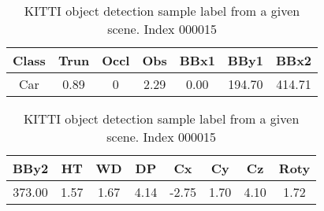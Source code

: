 \begin{table}[h]
\centering
\caption{KITTI object detection sample label from a given scene. Index 000015}
\begin{tabular}{|c|c|c|c|c|c|c|}
\hline
Class & Trun & Occl & Obs  & BBx1  & BBy1   & BBx2  \\
\hline
Car   & 0.89       & 0         & 2.29 & 0.00  & 194.70 & 414.71 \\
\hline
\end{tabular}
\begin{tabular}{|c|c|c|c|c|c|c|c|}
\hline
BBy2   & HT   & WD   & DP   & Cx    & Cy   & Cz   & Roty \\
\hline
373.00 & 1.57 & 1.67 & 4.14 & -2.75 & 1.70 & 4.10 & 1.72 \\
\hline
\end{tabular}


\label{SampleTable}
\end{table}


